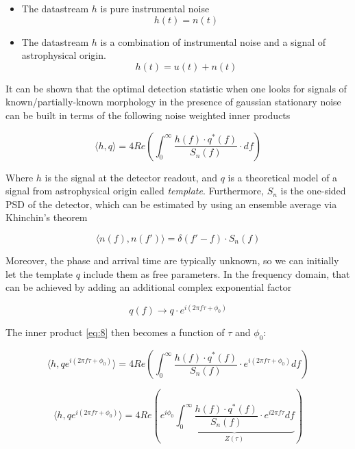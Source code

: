 \begin{itemize}
\item The datastream $h$ is pure instrumental noise
$$ h(t) = n(t)$$
\item The datastream $h$ is a combination of instrumental noise and a signal of astrophysical origin.
$$ h(t) = u(t) + n(t)$$
\end{itemize}


It can be shown that the optimal detection statistic when one looks for signals of known/partially-known morphology in the presence of gaussian stationary noise can be built in terms of the following noise weighted inner products

\begin{equation}\label{eq:8}
\langle h,q \rangle =4 Re\left( \int_{0}^{\infty} \frac{h(f) \cdot q^{*}(f)}{S_n(f)} \cdot df \right)
\end{equation}

Where $h$ is the signal at the detector readout, and $q$ is a theoretical model of a signal from astrophysical origin called \textit{template}. Furthermore, $S_n$ is the one-sided PSD of the detector,  which can be estimated by using an ensemble average via Khinchin's theorem

\begin{equation}\label{PSD}
\langle n(f), n(f') \rangle = \delta(f'-f) \cdot S_n(f)
\end{equation}


Moreover, the phase and arrival time are typically unknown, so we can initially let the template $q$  include them as free parameters. In the frequency domain, that can be achieved by adding an additional complex exponential factor 


\begin{equation}
q(f)\rightarrow q\cdot e^{i(2\pi f \tau + \phi_0)}
\end{equation}

The inner product \ref{eq:8} then becomes a function of $\tau$ and $\phi_0$:

\begin{equation}\label{eq:9}
\langle h,q e^{i(2\pi f \tau + \phi_0)} \rangle =4 Re\left( \int_{0}^{\infty} \frac{h(f) \cdot q^{*}(f) }{S_n(f)} \cdot e^{i(2\pi f \tau + \phi_0)} df \right)
\end{equation}

\begin{equation}\label{eq:10}
\langle h,q e^{i(2\pi f \tau + \phi_0)} \rangle =4 Re\left( e^{i \phi_0}\underbrace{\int_{0}^{\infty} \frac{h(f) \cdot q^{*}(f) }{S_n(f)} \cdot e^{i 2\pi f \tau} df}_{Z(\tau)} \right)
\end{equation}



